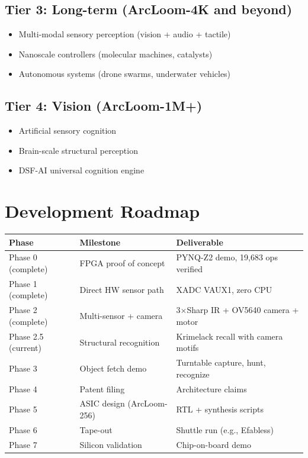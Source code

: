 \documentclass[11pt, a4paper]{article}
\begin{document}
\subsection{Tier 3: Long-term (ArcLoom-4K and beyond)}
\begin{itemize}[nosep]
  \item Multi-modal sensory perception (vision + audio + tactile)
  \item Nanoscale controllers (molecular machines, catalysts)
  \item Autonomous systems (drone swarms, underwater vehicles)
\end{itemize}

\subsection{Tier 4: Vision (ArcLoom-1M+)}
\begin{itemize}[nosep]
  \item Artificial sensory cognition
  \item Brain-scale structural perception
  \item DSF-AI universal cognition engine
\end{itemize}

\section{Development Roadmap}

\begin{center}
\begin{tabular}{@{}lll@{}}
\toprule
\textbf{Phase} & \textbf{Milestone} & \textbf{Deliverable} \\
\midrule
Phase 0 (complete) & FPGA proof of concept & PYNQ-Z2 demo, 19,683 ops verified \\
Phase 1 (complete) & Direct HW sensor path & XADC VAUX1, zero CPU \\
Phase 2 (complete) & Multi-sensor + camera & 3$\times$Sharp IR + OV5640 camera + motor \\
Phase 2.5 (current) & Structural recognition & Krimelack recall with camera motifs \\
Phase 3 & Object fetch demo & Turntable capture, hunt, recognize \\
Phase 4 & Patent filing & Architecture claims \\
Phase 5 & ASIC design (ArcLoom-256) & RTL + synthesis scripts \\
Phase 6 & Tape-out & Shuttle run (e.g., Efabless) \\
Phase 7 & Silicon validation & Chip-on-board demo \\
\bottomrule
\end{tabular}
\end{center}
\end{document}
